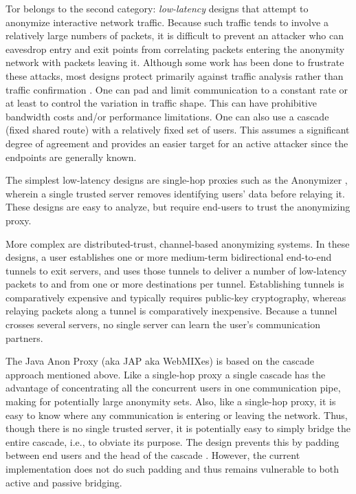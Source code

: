 \documentclass[times,10pt,twocolumn]{article}
\begin{document}
Tor belongs to the second category: \emph{low-latency} designs that
attempt to anonymize interactive network traffic.  Because such
traffic tends to involve a relatively large numbers of packets, it is
difficult to prevent an attacker who can eavesdrop entry and exit
points from correlating packets entering the anonymity network with
packets leaving it. Although some work has been done to frustrate
these attacks, most designs protect primarily against traffic analysis
rather than traffic confirmation \cite{or-jsac98}.  One can pad and
limit communication to a constant rate or at least to control the
variation in traffic shape. This can have prohibitive bandwidth costs
and/or performance limitations. One can also use a cascade (fixed
shared route) with a relatively fixed set of users. This assumes a
significant degree of agreement and provides an easier target for an active
attacker since the endpoints are generally known.

The simplest low-latency designs are single-hop proxies such as the
Anonymizer \cite{anonymizer}, wherein a single trusted server removes
identifying users' data before relaying it.  These designs are easy to
analyze, but require end-users to trust the anonymizing proxy.

More complex are distributed-trust, channel-based anonymizing systems.  In
these designs, a user establishes one or more medium-term bidirectional
end-to-end tunnels to exit servers, and uses those tunnels to deliver a
number of low-latency packets to and from one or more destinations per
tunnel.  Establishing tunnels is comparatively expensive and typically
requires public-key cryptography, whereas relaying packets along a tunnel is
comparatively inexpensive.  Because a tunnel crosses several servers, no
single server can learn the user's communication partners.

The Java Anon Proxy (aka JAP aka WebMIXes) is based on the cascade
approach mentioned above. Like a single-hop proxy a single cascade has
the advantage of concentrating all the concurrent users in one
communication pipe, making for potentially large anonymity sets.
Also, like a single-hop proxy, it is easy to know where any
communication is entering or leaving the network. Thus, though there
is no single trusted server, it is potentially easy to simply bridge
the entire cascade, i.e., to obviate its purpose. The design prevents
this by padding between end users and the head of the cascade
\cite{web-mix}. However, the current implementation does not do such
padding and thus remains vulnerable to both active and passive
bridging.
\end{document}
